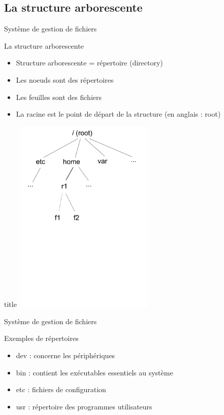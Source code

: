 \subsection{La structure arborescente}
\begin{frame}{Système de gestion de fichiers}
\begin{block}{La structure arborescente}
\begin{itemize}
\item Structure arborescente = répertoire (directory)
\item Les noeuds sont des répertoires
\item Les feuilles sont des fichiers
\item La racine est le point de départ de la structure (en anglais : root)
\end{itemize}
\end{block}

\begin{block}{title}
\includegraphics[width=0.5\textwidth]{images/arbo.pdf}
\end{block}

\end{frame}

\begin{frame}{Système de gestion de fichiers}
\begin{block}{Exemples de répertoires}
\begin{itemize}
\item dev : concerne les périphériques
\item bin : contient les exécutables essentiels au système
\item etc : fichiers de configuration
\item usr : répertoire des programmes utilisateurs
\end{itemize}
\end{block}

\end{frame}


